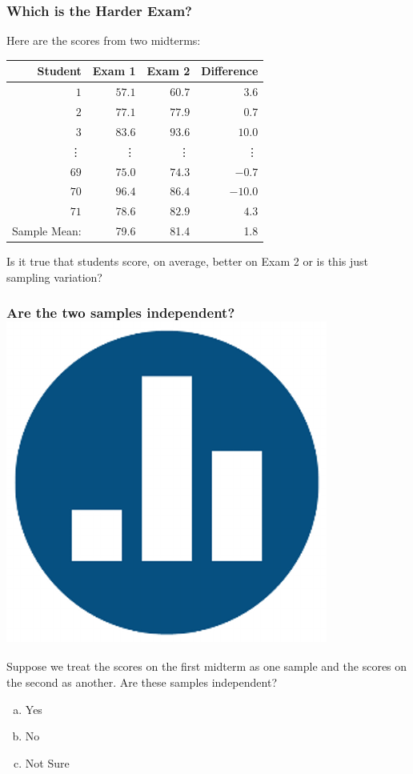 \begin{frame}
\frametitle{Which is the Harder Exam?}
Here are the scores from two midterms:
%
\begin{table}[!tbp]
\begin{center}
\begin{tabular}{rrrr}
\hline\hline
\multicolumn{1}{r}{Student}&\multicolumn{1}{r}{Exam 1}&\multicolumn{1}{r}{Exam 2}&\multicolumn{1}{r}{Difference}\tabularnewline
\hline
$ 1$&$57.1$&$60.7$&$  3.6$\tabularnewline
$ 2$&$77.1$&$77.9$&$  0.7$\tabularnewline
$ 3$&$83.6$&$93.6$&$ 10.0$\tabularnewline
\vdots&\vdots&\vdots&\vdots\\
$69$&$75.0$&$74.3$&$ -0.7$\tabularnewline
$70$&$96.4$&$86.4$&$-10.0$\tabularnewline
$71$&$78.6$&$82.9$&$  4.3$\tabularnewline
\hline
Sample Mean: & 79.6 & 81.4  &1.8\\
\hline
\end{tabular}
\end{center}
\end{table}

\alert{Is it true that students score, on average, better on Exam 2 or is this just sampling variation?}
\end{frame}
\begin{frame}
\frametitle{Are the two samples independent? \hfill \includegraphics[scale = 0.05]{./images/clicker}}
Suppose we treat the scores on the first midterm as one sample and the scores on the second as another. Are these samples independent?

\begin{enumerate}[(a)]
	\item Yes
	\item No
	\item Not Sure
\end{enumerate}


\end{frame}
